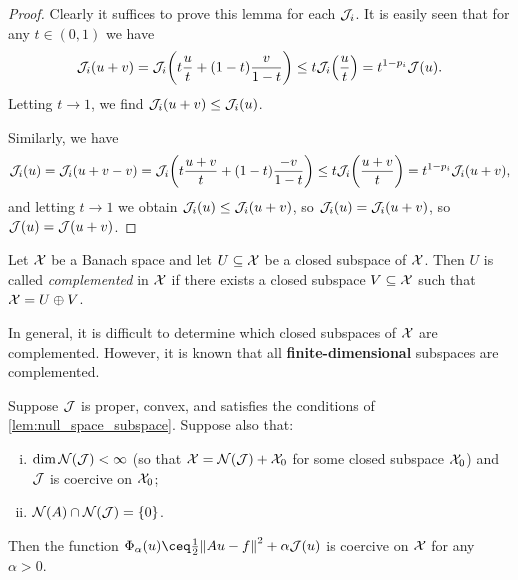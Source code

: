 \begin{proof}
	Clearly it suffices to prove this lemma for each $\mathcal J_i$. It is easily seen that for any $t \in (0, 1)$ we have
	\[
	\mathcal J_i(u + v) = \mathcal J_i \qty(t \frac ut + (1-t) \frac{v}{1-t}) \leq t \mathcal J_i \qty(\frac ut) = t^{1 - p_i} \mathcal J(u). 
	\]
	Letting $t \to 1$, we find $\mathcal J_i(u + v) \leq \mathcal J_i(u)$. 
	
	Similarly, we have
	\[
	\mathcal J_i(u) = \mathcal J_i(u + v - v) = \mathcal J_i \qty(t \frac{ u+ v}{t} + (1-t) \frac{-v}{1-t}) \leq t \mathcal J_i\qty(\frac{u+ v}{t}) = t^{1 - p_i} \mathcal J_i(u + v), 
	\]
	and letting $t \to 1$ we obtain $\mathcal J_i(u) \leq \mathcal J_i(u+v)$, so $\mathcal J_i(u) = \mathcal J_i(u+v)$, so $\mathcal J(u) = \mathcal J(u + v)$. 
\end{proof}

\begin{recap}
	Let $\mathcal X$ be a Banach space and let $U \subseteq \mathcal X$ be a closed subspace of $\mathcal X$. Then $U$ is called \emph{complemented} in $\mathcal X$ if there exists a closed subspace $V \subseteq \mathcal X$ such that $\mathcal X = U \oplus V$. 
	
	In general, it is difficult to determine which closed subspaces of $\mathcal X$ are complemented. However, it is known that all \textbf{finite-dimensional} subspaces are complemented. 
\end{recap}
\begin{lemma} \label{lem:regulariser_coercive}
	Suppose $\mathcal J$ is proper, convex, and satisfies the conditions of \cref{lem:null_space_subspace}. Suppose also that:
	\begin{enumerate}[(i)]
		\item $\dim \operatorname{\mathcal N}(\mathcal J) < \infty$ (so that $\mathcal X = \operatorname{\mathcal N}(\mathcal J) + \mathcal X_0$ for some closed subspace $\mathcal X_0$) and $\mathcal J$ is coercive on $\mathcal X_0$;
		\item $\operatorname{\mathcal N}(A) \cap \operatorname{\mathcal N}(\mathcal J) = \qty{0}$. 
	\end{enumerate}

Then the function $\Phi_\alpha(u) \ceq \frac12\norm{Au - f}^2 + \alpha \JJ(u)$ is coercive on $\mathcal X$ for any $\alpha > 0$. 
\end{lemma}

